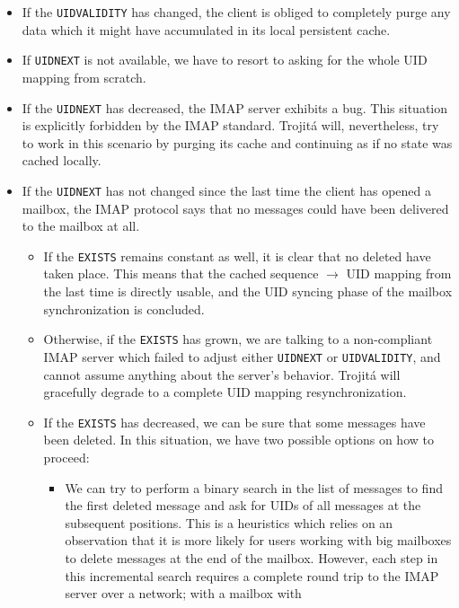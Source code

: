 \documentclass[trojita]{subfiles}
\begin{document}
\begin{itemize}
    \item If the {\tt UIDVALIDITY} has changed, the client is obliged to completely purge any data which it might have
        accumulated in its local persistent cache.
    \item If {\tt UIDNEXT} is not available, we have to resort to asking for the whole UID mapping from scratch.
    \item If the {\tt UIDNEXT} has decreased, the IMAP server exhibits a bug.  This situation is explicitly forbidden by
        the IMAP standard.  Trojitá will, nevertheless, try to work in this scenario by purging its cache and continuing
        as if no state was cached locally.
    \item If the {\tt UIDNEXT} has not changed since the last time the client has opened a mailbox, the IMAP protocol
        says that no messages could have been delivered to the mailbox at all.
        \begin{itemize}
            \item If the {\tt EXISTS} remains constant as well, it is clear that no deleted have taken place. This means
                that the cached sequence $\rightarrow$ UID mapping from the last time is directly usable, and the UID
                syncing phase of the mailbox synchronization is concluded.
            \item Otherwise, if the {\tt EXISTS} has grown, we are talking to a non-compliant IMAP server which failed
                to adjust either {\tt UIDNEXT} or {\tt UIDVALIDITY}, and cannot assume anything about the server's
                behavior.  Trojitá will gracefully degrade to a complete UID mapping resynchronization.
            \item If the {\tt EXISTS} has decreased, we can be sure that some messages have been deleted.  In this
                situation, we have two possible options on how to proceed:
                \begin{itemize}
                    \item We can try to perform a binary search in the list of messages to find the first deleted
                        message and ask for UIDs of all messages at the subsequent positions.  This is a heuristics
                        which relies on an observation that it is more likely for users working with big mailboxes to
                        delete messages at the end of the mailbox.  However, each step in this incremental search
                        requires a complete round trip to the IMAP server over a network; with a mailbox with

\end{itemize}
\end{itemize}
\end{itemize}
\end{document}
